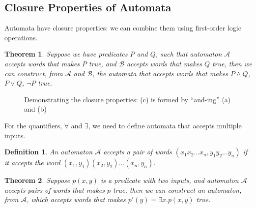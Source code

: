\documentclass[landscape,usenames,dvipsnames]{sciposter}
\newtheorem{thm}{Theorem}%
\newtheorem*{defin}{Definition}
\begin{document}
\begin{multicols}{3}
\begin{mdframed}[style=MyFrame]
\subsection*{Closure Properties of Automata}
\end{mdframed}
Automata have closure properties: we can combine them using first-order logic operations.
\begin{thm}
    Suppose we have predicates $P$ and $Q$, such that automaton $\mathcal{A}$ accepts words that makes $P$ true, and $\mathcal{B}$ accepts words that makes $Q$ true, then we can construct, from $\mathcal{A}$ and $\mathcal{B}$, the automata that accepts words that makes $P \land Q$, $P \lor Q$, $\lnot P$ true.
\end{thm}

\vspace{-15mm}
\begin{figure}[h]
    \caption{Demonstrating the closure properties: (c) is formed by ``and-ing'' (a) and (b)}
\end{figure}
\vspace{-20mm}

For the quantifiers, $\forall$ and $\exists$, we need to define automata that accepts multiple inputs. 
\begin{defin}
    An automaton $\mathcal{A}$ accepts a pair of words $ (x_1x_2\dots x_n, y_1y_2\dots y_n)$ if it accepts the word $(x_1,y_1)(x_2,y_2)\dots(x_n,y_n)$.
\end{defin}
\begin{thm}
    Suppose $p(x,y)$ is a predicate with two inputs, and automaton $\mathcal{A}$ accepts pairs of words that makes $p$ true, then we can construct an automaton, from $\mathcal{A}$, which accepts words that makes $p'(y) = \exists x. p(x,y)$ true.
\end{thm}


\end{multicols}
\end{document}
